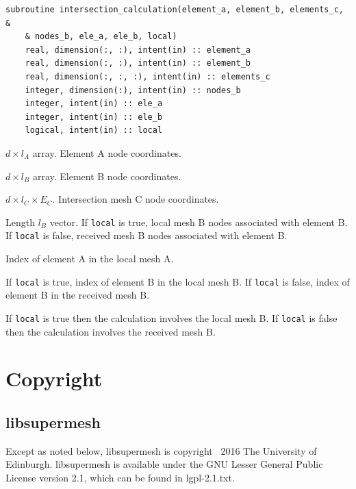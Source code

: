 \documentclass{article}
\begin{document}
\begin{lstlisting}[language=FORTRAN]
  subroutine intersection_calculation(element_a, element_b, elements_c, &
    & nodes_b, ele_a, ele_b, local)
    real, dimension(:, :), intent(in) :: element_a
    real, dimension(:, :), intent(in) :: element_b
    real, dimension(:, :, :), intent(in) :: elements_c
    integer, dimension(:), intent(in) :: nodes_b
    integer, intent(in) :: ele_a
    integer, intent(in) :: ele_b
    logical, intent(in) :: local
\end{lstlisting}

\begin{description}[font=\ttfamily\bfseries,leftmargin=2.2\parindent,labelindent=1.7\parindent,noitemsep]
  \item[element\_a] $d \times l_A$ array. Element A node coordinates.
  \item[element\_b] $d \times l_B$ array. Element B node coordinates.
  \item[elements\_c] $d \times l_C \times E_C$. Intersection mesh C node
    coordinates.
  \item[nodes\_b] Length $l_B$ vector. If \verb+local+ is true, local mesh B
    nodes associated with element B. If \verb+local+ is false, received mesh B
    nodes associated with element B.
  \item[ele\_a] Index of element A in the local mesh A.
  \item[ele\_b] If \verb+local+ is true, index of element B in the local mesh B.
    If \verb+local+ is false, index of element B in the received mesh B.
  \item[local] If \verb+local+ is true then the calculation involves the local
    mesh B. If \verb+local+ is false then the calculation involves the received
    mesh B.
\end{description}

\section{Copyright}\label{sect:copyright}

\subsection{libsupermesh}

Except as noted below, libsupermesh is copyright \textcopyright\ 2016 The
University of Edinburgh. libsupermesh is available under the GNU Lesser General
Public License version 2.1, which can be found in lgpl-2.1.txt.
\end{document}
